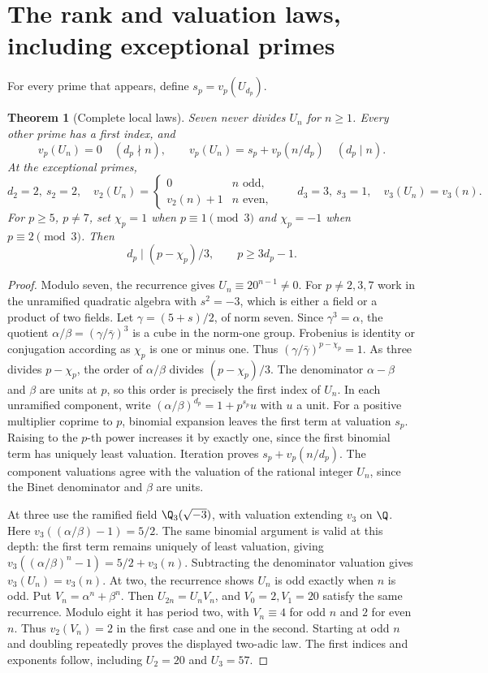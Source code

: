 \documentclass[11pt]{amsart}
\newtheorem{theorem}{Theorem}[section]
\theoremstyle{definition}\newtheorem{definition}[theorem]{Definition}
\theoremstyle{remark}\newtheorem{remark}[theorem]{Remark}
\begin{document}
\section{The rank and valuation laws, including exceptional primes}
For every prime that appears, define $s_p=v_p(U_{d_p})$.
\begin{theorem}[Complete local laws]\label{thm:local}
Seven never divides $U_n$ for $n\ge1$. Every other prime has a first index, and
\[
 v_p(U_n)=0\quad(d_p\nmid n),\qquad
 v_p(U_n)=s_p+v_p(n/d_p)\quad(d_p\mid n).
\]
At the exceptional primes,
\[
 d_2=2,\ s_2=2,\quad
 v_2(U_n)=\begin{cases}0&n\text{ odd},\\v_2(n)+1&n\text{ even},\end{cases}
 \qquad d_3=3,\ s_3=1,\quad v_3(U_n)=v_3(n).
\]
For $p\ge5$, $p\ne7$, set $\chi_p=1$ when $p\equiv1\pmod3$ and $\chi_p=-1$ when $p\equiv2\pmod3$. Then
\[
 d_p\mid(p-\chi_p)/3,\qquad p\ge3d_p-1.
\]
\end{theorem}
\begin{proof}
Modulo seven, the recurrence gives $U_n\equiv20^{n-1}\ne0$. For $p\ne2,3,7$ work in the unramified quadratic algebra with $s^2=-3$, which is either a field or a product of two fields. Let $\gamma=(5+s)/2$, of norm seven. Since $\gamma^3=\alpha$, the quotient $\alpha/\beta=(\gamma/\bar\gamma)^3$ is a cube in the norm-one group. Frobenius is identity or conjugation according as $\chi_p$ is one or minus one. Thus $(\gamma/\bar\gamma)^{p-\chi_p}=1$. As three divides $p-\chi_p$, the order of $\alpha/\beta$ divides $(p-\chi_p)/3$. The denominator $\alpha-\beta$ and $\beta$ are units at $p$, so this order is precisely the first index of $U_n$.
In each unramified component, write $(\alpha/\beta)^{d_p}=1+p^{s_p}u$ with $u$ a unit. For a positive multiplier coprime to $p$, binomial expansion leaves the first term at valuation $s_p$. Raising to the $p$-th power increases it by exactly one, since the first binomial term has uniquely least valuation. Iteration proves $s_p+v_p(n/d_p)$. The component valuations agree with the valuation of the rational integer $U_n$, since the Binet denominator and $\beta$ are units.

At three use the ramified field $\Q_3(\sqrt{-3})$, with valuation extending $v_3$ on $\Q$. Here $v_3((\alpha/\beta)-1)=5/2$. The same binomial argument is valid at this depth: the first term remains uniquely of least valuation, giving $v_3((\alpha/\beta)^n-1)=5/2+v_3(n)$. Subtracting the denominator valuation gives $v_3(U_n)=v_3(n)$.
At two, the recurrence shows $U_n$ is odd exactly when $n$ is odd. Put $V_n=\alpha^n+\beta^n$. Then $U_{2n}=U_nV_n$, and $V_0=2,V_1=20$ satisfy the same recurrence. Modulo eight it has period two, with $V_n\equiv4$ for odd $n$ and $2$ for even $n$. Thus $v_2(V_n)=2$ in the first case and one in the second. Starting at odd $n$ and doubling repeatedly proves the displayed two-adic law. The first indices and exponents follow, including $U_2=20$ and $U_3=57$.
\end{proof}
\end{document}
